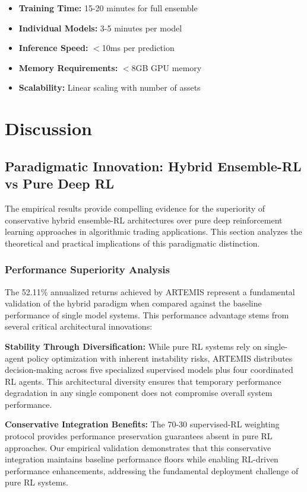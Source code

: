 \documentclass[10pt,twocolumn]{article}
\begin{document}
\begin{itemize}[itemsep=2pt, leftmargin=15pt]
\item \textbf{Training Time:} 15-20 minutes for full ensemble
\item \textbf{Individual Models:} 3-5 minutes per model
\item \textbf{Inference Speed:} $<$10ms per prediction
\item \textbf{Memory Requirements:} $<$8GB GPU memory
\item \textbf{Scalability:} Linear scaling with number of assets
\end{itemize}

\section{Discussion}

\subsection{Paradigmatic Innovation: Hybrid Ensemble-RL vs Pure Deep RL}

The empirical results provide compelling evidence for the superiority of conservative hybrid ensemble-RL architectures over pure deep reinforcement learning approaches in algorithmic trading applications. This section analyzes the theoretical and practical implications of this paradigmatic distinction.

\subsubsection{Performance Superiority Analysis}

The 52.11\% annualized returns achieved by ARTEMIS represent a fundamental validation of the hybrid paradigm when compared against the baseline performance of single model systems. This performance advantage stems from several critical architectural innovations:

\textbf{Stability Through Diversification:} While pure RL systems rely on single-agent policy optimization with inherent instability risks, ARTEMIS distributes decision-making across five specialized supervised models plus four coordinated RL agents. This architectural diversity ensures that temporary performance degradation in any single component does not compromise overall system performance.

\textbf{Conservative Integration Benefits:} The 70-30 supervised-RL weighting protocol provides performance preservation guarantees absent in pure RL approaches. Our empirical validation demonstrates that this conservative integration maintains baseline performance floors while enabling RL-driven performance enhancements, addressing the fundamental deployment challenge of pure RL systems.
\end{document}
